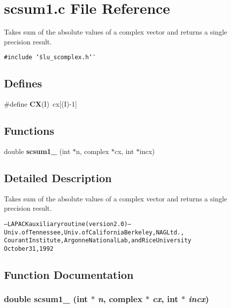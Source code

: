 \section{scsum1.c File Reference}
\label{scsum1_8c}
Takes sum of the absolute values of a complex vector and returns a single precision result. 

{\tt \#include \char`\"{}slu\_\-scomplex.h\char`\"{}}\par
\subsection*{Defines}
\begin{CompactItemize}
\item 
\#define {\bf CX}(I)~cx[(I)-1]\label{scsum1_8c_5a76da95c549c41790389a76e12fdcb5}

\end{CompactItemize}
\subsection*{Functions}
\begin{CompactItemize}
\item 
double {\bf scsum1\_\-} (int $\ast$n, complex $\ast$cx, int $\ast$incx)
\end{CompactItemize}


\subsection{Detailed Description}
Takes sum of the absolute values of a complex vector and returns a single precision result. 

\small\begin{alltt}
     -- LAPACK auxiliary routine (version 2.0) --   
     Univ. of Tennessee, Univ. of California Berkeley, NAG Ltd.,   
     Courant Institute, Argonne National Lab, and Rice University   
     October 31, 1992   
 \end{alltt}\normalsize 
 

\subsection{Function Documentation}
\subsubsection{\setlength{\rightskip}{0pt plus 5cm}double scsum1\_\- (int $\ast$ {\em n}, complex $\ast$ {\em cx}, int $\ast$ {\em incx})}\label{scsum1_8c_5d1c88cf76514de82b3ab994dd6990f4}


